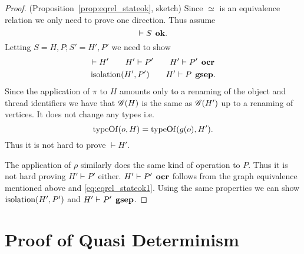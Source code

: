 \begin{proof}{(Proposition~\ref{prop:eqrel_stateok}, sketch)}
  Since $\simeq$ is an equivalence relation we only need to prove one direction.
  Thus assume
  \begin{equation}
    \vdash S \:\: \mbox{\bf ok}.
  \end{equation}
  Letting $S = H, P; S' = H', P'$ we need to show
  \begin{equation} 
    \begin{gathered}
      \vdash H' \quad\quad H' \vdash P' \quad\quad H' \vdash P' \:\: \mbox{\bf ocr} \\
      \mbox{$\mathrm{isolation}$}(H', P') \quad\quad H' \vdash P \:\: \mbox{\bf gsep}.
    \end{gathered}
  \end{equation}
  Since the application of $\pi$ to $H$ amounts only to a renaming of the object
  and thread identifiers we have that $\mathscr{G}(H)$ is the same as $\mathscr{G}(H')$ up to a
  renaming of vertices. It does not change any types i.e. 
  \begin{equation} \label{eq:eqrel_stateok1}
    \mbox{$\mathrm{typeOf}$}(o, H) = \mbox{$\mathrm{typeOf}$}(g(o), H').
  \end{equation}
  Thus it is not hard to prove $\vdash H'$. 
  
  The application of $\rho$ similarly does the same kind of operation to $P$.
  Thus it is not hard proving $H' \vdash P'$ either.
  $H' \vdash P' \:\: \mbox{\bf ocr}$ follows from the graph equivalence mentioned above
  and \eqref{eq:eqrel_stateok1}. Using the same properties we can show
  $\mbox{$\mathrm{isolation}$}(H', P')$ and $H' \vdash P' \:\: \mbox{\bf gsep}$.
\end{proof}

\section{Proof of Quasi Determinism}
\label{sec:proof_of_quasi_determinism}

